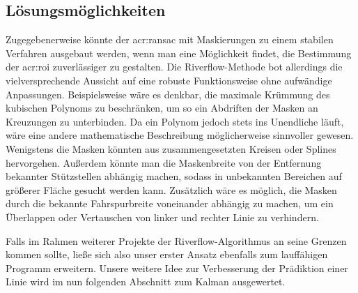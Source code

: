 \subsection{Lösungsmöglichkeiten}

Zugegebenerweise könnte der \gls{acr:ransac} mit Maskierungen zu einem stabilen Verfahren ausgebaut werden, wenn man eine Möglichkeit findet, die Bestimmung der \gls{acr:roi} zuverlässiger zu gestalten. Die Riverflow-Methode bot allerdings die vielversprechende Aussicht auf eine robuste Funktionsweise ohne aufwändige Anpassungen. 
Beispielsweise wäre es denkbar, die maximale Krümmung des kubischen Polynoms zu beschränken, um so ein Abdriften der Masken an Kreuzungen zu unterbinden. Da ein Polynom jedoch stets ins Unendliche läuft, wäre eine andere mathematische Beschreibung möglicherweise sinnvoller gewesen. Wenigstens die Masken könnten aus zusammengesetzten Kreisen oder Splines hervorgehen. Außerdem könnte man die Maskenbreite von der Entfernung bekannter Stützstellen abhängig machen, sodass in unbekannten Bereichen auf größerer Fläche gesucht werden kann. Zusätzlich wäre es möglich, die Masken durch die bekannte Fahrspurbreite voneinander abhängig zu machen, um ein Überlappen oder Vertauschen von linker und rechter Linie zu verhindern.

Falls im Rahmen weiterer Projekte der Riverflow-Algorithmus an seine Grenzen kommen sollte, ließe sich also unser erster Ansatz ebenfalls zum lauffähigen Programm erweitern. Unsere weitere Idee zur Verbesserung der Prädiktion einer Linie wird im nun folgenden Abschnitt zum Kalman ausgewertet.

